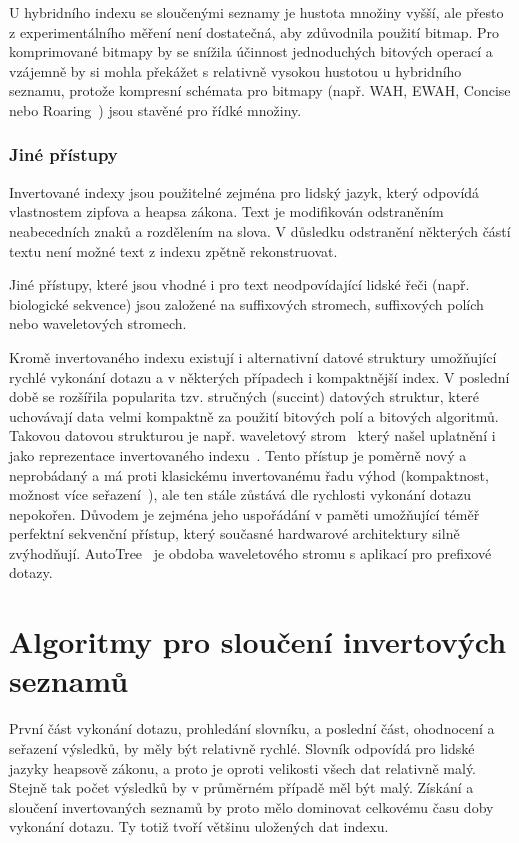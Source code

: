 \documentclass[11pt,letterpaper,oneside,openright]{book}
\begin{document}
U hybridního indexu se sloučenými seznamy je hustota množiny vyšší, ale přesto
z experimentálního měření není dostatečná, aby zdůvodnila použití bitmap. Pro
komprimované bitmapy by se snížila účinnost jednoduchých bitových operací a
vzájemně by si mohla překážet s relativně vysokou hustotou u hybridního
seznamu, protože kompresní schémata pro bitmapy (např. WAH, EWAH, Concise nebo
Roaring~\cite{DBLP:journals/corr/LemireKK16}) jsou stavěné pro řídké množiny.


\subsubsection{Jiné přístupy}
Invertované indexy jsou použitelné zejména pro lidský jazyk, který odpovídá
vlastnostem zipfova a heapsa zákona. Text je modifikován odstraněním
neabecedních znaků a rozdělením na slova. V důsledku odstranění některých částí
textu není možné text z indexu zpětně rekonstruovat.

Jiné přístupy, které jsou vhodné i pro text neodpovídající lidské řeči (např.
biologické sekvence) jsou založené na suffixových stromech, suffixových polích
nebo waveletových stromech.


Kromě invertovaného indexu existují i alternativní datové struktury umožňující
rychlé vykonání dotazu a v některých případech i kompaktnější index. V poslední
době se rozšířila popularita tzv. stručných (succint) datových struktur, které
uchovávají data velmi kompaktně za použití bitových polí a bitových algoritmů.
Takovou datovou strukturou je např. waveletový
strom~\cite{Grossi:2003:HET:644108.644250} který našel uplatnění i jako
reprezentace invertovaného
indexu~\cite{Ferragina:2007:CRS:1240233.1240243,FERRAGINA2009849}. Tento
přístup je poměrně nový a neprobádaný a má proti klasickému invertovanému řadu
výhod (kompaktnost, možnost více seřazení~\cite{Navarro2010}), ale ten stále
zůstává dle rychlosti vykonání dotazu nepokořen.  Důvodem je zejména jeho
uspořádání v paměti umožňující téměř perfektní sekvenční přístup, který
současné hardwarové architektury silně zvýhodňují. AutoTree~\cite{Weber2007} je
obdoba waveletového stromu s aplikací pro prefixové dotazy.



\section{Algoritmy pro sloučení invertových seznamů}
První část vykonání dotazu, prohledání slovníku, a poslední část, ohodnocení a
seřazení výsledků, by měly být relativně rychlé. Slovník odpovídá pro lidské
jazyky heapsově zákonu, a proto je oproti velikosti všech dat relativně malý.
Stejně tak počet výsledků by v průměrném případě měl být malý. Získání a
sloučení invertovaných seznamů by proto mělo dominovat celkovému času doby
vykonání dotazu. Ty totiž tvoří většinu uložených dat indexu.
\end{document}

